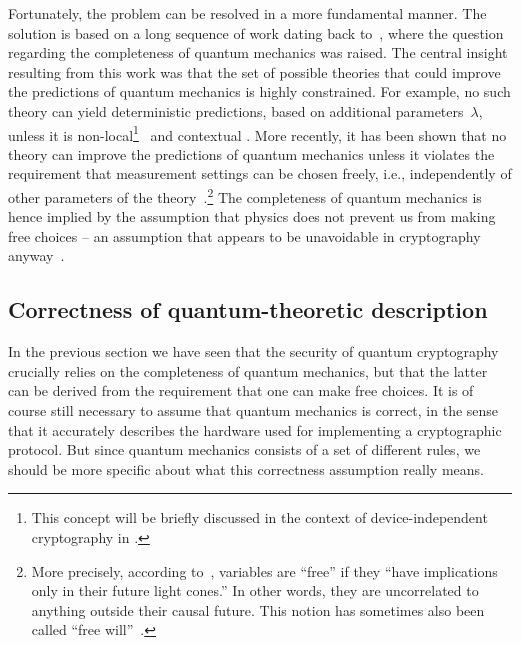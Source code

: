 Fortunately, the problem can be resolved in a more fundamental manner. The solution is based on a long sequence of work dating back to~\textcite{Born26,EPR35},  where the question regarding the completeness of quantum mechanics was raised. The central insight resulting from this work was that the set of possible theories that could improve the predictions of quantum mechanics is highly constrained. For example, no such theory can yield deterministic predictions, based on additional parameters~$\lambda$, unless it is non-local\footnote{This concept will be briefly discussed in the context of device-independent cryptography in .}~\cite{Bell64} and contextual \cite{Bell66,KocSpe67}. More recently, it has been shown that no theory can improve the predictions of quantum mechanics unless it violates the requirement that measurement settings can be chosen freely, i.e., independently of other parameters of the theory~\cite{CR11}.\footnote{More precisely, according to~\textcite{BellFree}, variables are ``free'' if they ``have implications only in their future light cones.'' In other words, they are uncorrelated to anything outside their causal future. This notion has sometimes also been called ``free will''~\cite{Conway2006}.} The completeness of quantum mechanics is hence implied by the assumption that physics does not prevent us from making free choices \--- an assumption that appears to be unavoidable in cryptography anyway~\cite{ER14}. 

\subsection{Correctness of quantum-theoretic description}

In the previous section we have seen that the security of quantum cryptography crucially relies on the completeness of quantum mechanics, but that the latter can be derived from the requirement that one can make free choices.  It is of course still necessary to assume that quantum mechanics is correct, in the sense that it accurately describes the  hardware used for implementing a cryptographic protocol. But since  quantum mechanics consists of a set of different rules,  we should  be more specific about what this correctness assumption really means. 

